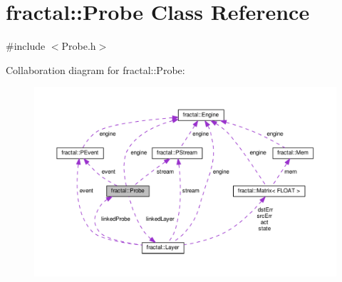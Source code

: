 \hypertarget{classfractal_1_1Probe}{\section{fractal\+:\+:Probe Class Reference}
\label{classfractal_1_1Probe}
}


{\ttfamily \#include $<$Probe.\+h$>$}



Collaboration diagram for fractal\+:\+:Probe\+:\nopagebreak
\begin{figure}[H]
\begin{center}
\leavevmode
\includegraphics[width=350pt]{dd/dd3/classfractal_1_1Probe__coll__graph}
\end{center}
\end{figure}

